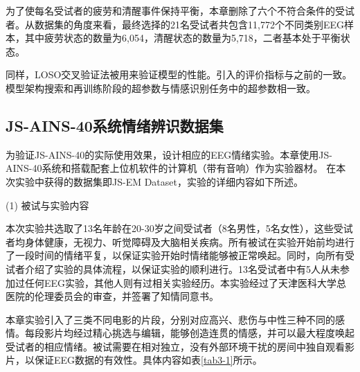 为了使每名受试者的疲劳和清醒事件保持平衡，本章删除了六个不符合条件的受试者。从数据集的角度来看，最终选择的21名受试者共包含11,772个不同类别EEG样本，其中疲劳状态的数量为6,054，清醒状态的数量为5,718，二者基本处于平衡状态。

同样，LOSO交叉验证法被用来验证模型的性能。引入的评价指标与之前的一致。模型架构搜索和再训练阶段的超参数与情感识别任务中的超参数相一致。




\subsection{JS-AINS-40系统情绪辨识数据集}
为验证JS-AINS-40的实际使用效果，设计相应的EEG情绪实验。本章使用JS-AINS-40系统和搭载配套上位机软件的计算机（带有音响）作为实验器材。
在本次实验中获得的数据集即JS-EM Dataset，实验的详细内容如下所述。

(1) 被试与实验内容

本次实验共选取了13名年龄在20-30岁之间受试者（8名男性，5名女性），这些受试者均身体健康，无视力、听觉障碍及大脑相关疾病。所有被试在实验开始前均进行了一段时间的情绪平复，以保证实验开始时情绪能够被正常唤起。同时，向所有受试者介绍了实验的具体流程，以保证实验的顺利进行。13名受试者中有5人从未参加过任何EEG实验，其他人则有过相关实验经历。本实验经过了天津医科大学总医院的伦理委员会的审查，并签署了知情同意书。

本章实验引入了三类不同电影的片段，分别对应高兴、悲伤与中性三种不同的感情。每段影片均经过精心挑选与编辑，能够创造连贯的情感，并可以最大程度唤起受试者的相应情绪。被试需要在相对独立，没有外部环境干扰的房间中独自观看影片，以保证EEG数据的有效性。具体内容如表\ref{tab3-1}所示。

\begin{table*}[!h]
\caption{电影片段具体信息}  \label{tab3-1}
\centering
{}
\end{table*}

